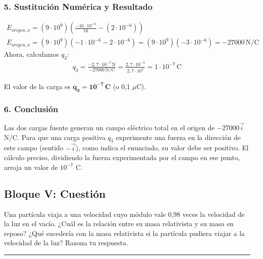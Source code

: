 \subsubsection*{5. Sustitución Numérica y Resultado}
\begin{gather}
    E_{origen,x} = (9\cdot10^9) \left(\frac{-16\cdot10^{-6}}{16} - (2\cdot10^{-6})\right) \\
    E_{origen,x} = (9\cdot10^9) (-1\cdot10^{-6} - 2\cdot10^{-6}) = (9\cdot10^9)(-3\cdot10^{-6}) = -27000 \, \text{N/C}
\end{gather}
Ahora, calculamos $q_3$:
\begin{gather}
    q_3 = \frac{-2,7\cdot10^{-3}\,\text{N}}{-27000\,\text{N/C}} = \frac{2,7\cdot10^{-3}}{2,7\cdot10^{4}} = 1\cdot10^{-7} \, \text{C}
\end{gather}
\begin{cajaresultado}
El valor de la carga es $\boldsymbol{q_3 = 10^{-7}\,\textbf{C}}$ (o 0,1 $\mu$C).
\end{cajaresultado}

\subsubsection*{6. Conclusión}
\begin{cajaconclusion}
Las dos cargas fuente generan un campo eléctrico total en el origen de $-27000\vec{i}$ N/C. Para que una carga positiva $q_3$ experimente una fuerza en la dirección de este campo (sentido $-\vec{i}$), como indica el enunciado, su valor debe ser positivo. El cálculo preciso, dividiendo la fuerza experimentada por el campo en ese punto, arroja un valor de $10^{-7}$ C.
\end{cajaconclusion}

\newpage

\subsection{Bloque V: Cuestión}
\label{subsec:A5_2011_jun_ord}

\begin{cajaenunciado}
Una partícula viaja a una velocidad cuyo módulo vale 0,98 veces la velocidad de la luz en el vacío. ¿Cuál es la relación entre su masa relativista y su masa en reposo? ¿Qué sucedería con la masa relativista si la partícula pudiera viajar a la velocidad de la luz? Razona tu respuesta.
\end{cajaenunciado}
\hrule

